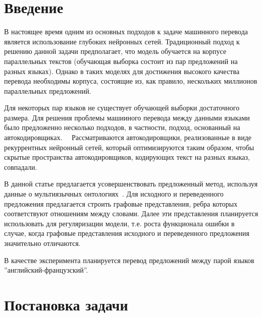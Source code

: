 \documentclass[12pt,twoside]{article}
\title
{Обучение машинного перевода без параллельных текстов}
\author
{Ямалутдинов~А.\,В.,  Стрижов~В.\,В., Бахтеев~О.\,Ю.} %
\begin{document}
	
	\maketitle
	
	\section{Введение}
	В настоящее время одним из основных подходов к задаче машинного перевода является использование глубоких нейронных сетей.
	Традиционный подход к решению данной задачи предполагает, что модель обучается на корпусе параллельных текстов 
	(обучающая выборка состоит из пар предложений на разных языках)\cite{neubig2017translation}. Однако в таких моделях для достижения
	высокого качества перевода необходимы корпуса, состоящие из, как правило, нескольких миллионов параллельных предложений\cite{bahdanu2016corpus}.

	Для некоторых пар языков не существует обучающей выборки достаточного размера. Для решения проблемы машииного перевода между
	данными языками было предложенно несколько подходов, в частности, подход, основанный на автокодировщиках.~\cite{cho2014autoencoders}~\cite{conneau2018unsupervised}
	Рассматриваются автокодировщики, реализованные в виде рекуррентных нейронный сетей, который оптимизируются таким образом, 
	чтобы скрытые пространства автокодировщиков, кодирующих текст на разных языказ, совпадали.

	В данной статье предлагается усовершенствовать предложенный метод, используя данные о мультиязычных онтологиях~\cite{navigli2010wordsense}. 
	Для исходного и переведенного предложения предлагается строить графовые представления, ребра которых соответствуют отношениям между словами.
	Далее эти представления планируется использовать для регуляризации модели, т.е. роста функционала ошибки в случае, когда 
	графовые представления исходного и переведенного предложения значительно отличаются.

	В качестве эксперимента планируется перевод предложений между парой языков ''английский-французский''.

	\section{Постановка задачи}
	
	
	
\end{document}
